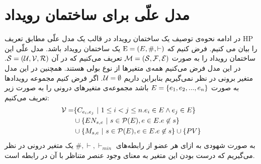 \section{مدل علّی برای ساختمان رویداد}
\label{es-causal-model}
در ادامه نحوه‌ی توصیف یک ساختمان رویداد در قالب یک مدل علّی مطابق تعریف 
HP
را بیان می کنیم.
فرض کنیم که
$\mathrm{E} = (E,\#,\vdash)$
یک ساختمان رویداد باشد.
مدل علّی این ساختمان رویداد را به صورت
$\mathcal{M} = (\mathcal{S},\mathcal{F},\mathcal{E})$
تعریف می‌کنیم که در آن
$\mathcal{S} = (\mathcal{U},\mathcal{V},\mathcal{R})$.
در این مدل فرض می‌کنیم همه‌ی متغیر‌ها از نوع بولی هستند.
همچنین در این مدل متغیر برونی در نظر نمی‌گیریم بنابراین داریم
$\mathcal{U} = \emptyset$.
اگر فرض کنیم مجموعه‌ رویدادها به صورت
$E = \{e_1,e_2,...,e_n\}$
باشد مجموعه‌ی متغیر‌های درونی را به صورت زیر تعریف می‌کنیم:
\begin{align*}
    \mathcal{V} = & \{C_{e_i,e_j} ~|~  1 \leq i < j \leq n.
    e_i \in E \wedge e_j \in E\}                              \\
                  & \cup \{EN_{s,e} ~|~ s \in \mathcal{P}(E),
    e \in E. e \not \in s \}                                  \\
                  & \cup \{M_{s,e} ~|~ s \in \mathcal{P}(E),
        e \in E. e \not \in s \} \cup \{PV\}
\end{align*}
به صورت شهودی به ازای هر عضو از رابطه‌های
$\#,\vdash,\vdash_{min}$
یک متغیر درونی در نظر می‌گیریم که درست بودن این متغیر به معنای وجود عنصر متناظر با آن در رابطه است.

